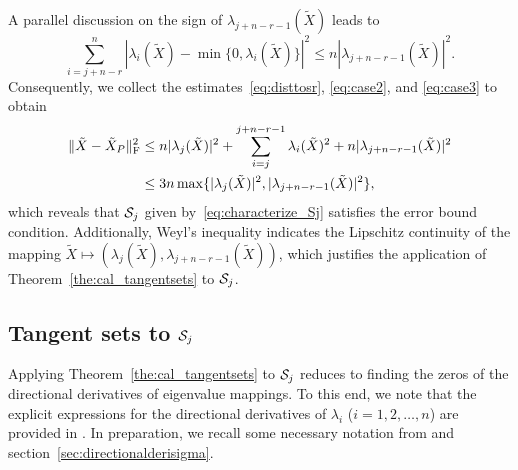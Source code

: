 A parallel discussion on the sign of $\lambda_{j+n-r-1}(\tilde{X})$ leads to 
\begin{equation}\label{eq:case3}
    \sum_{i=j+n-r}^n |\lambda_i(\tilde{X})-\min\{0,\lambda_i(\tilde{X})\}|^2 \le n |\lambda_{j+n-r-1}(\tilde{X})|^2.
\end{equation}
Consequently, we collect the estimates~\eqref{eq:disttosr}, \eqref{eq:case2}, and \eqref{eq:case3} to obtain
\begin{align}
\|\tilde{X}-\tilde{X}_P\|_{\mathrm{F}}^2 &\le n|\lambda_{j}(\tilde{X})|^2 + \sum_{i=j}^{j+n-r-1}\lambda_i(\tilde{X})^2 + n |\lambda_{j+n-r-1}(\tilde{X})|^2    \nonumber
\\
&\le 3n \max\{|\lambda_{j}(\tilde{X})|^2,|\lambda_{j+n-r-1}(\tilde{X})|^2\},    \label{eq:estimate_X-Xp}
\end{align}
which reveals that $\mathcal{S}_j$ given by~\eqref{eq:characterize_Sj} satisfies the error bound condition. Additionally, Weyl's inequality \cite{weyl1912inequality} indicates the Lipschitz continuity of the mapping $\tilde{X}\mapsto(\lambda_{j}(\tilde{X}),\lambda_{j+n-r-1}(\tilde{X}))$, which justifies the application of Theorem~\ref{the:cal_tangentsets} to $\mathcal{S}_j$.

\subsection{Tangent sets to $\mathcal{S}_j$}\label{app:tangent_Sj}
Applying Theorem~\ref{the:cal_tangentsets} to $\mathcal{S}_j$ reduces to finding the zeros of the directional derivatives of eigenvalue mappings. To this end, we note that the explicit expressions for the directional derivatives of $\lambda_i$ ($i=1,2,\ldots,n$) are provided in \cite{torki2001secondtoeigen,zhang2013secondordersingular}. In preparation, we recall some necessary notation from \cite{zhang2013secondordersingular} and section~\ref{sec:directionalderisigma}.

